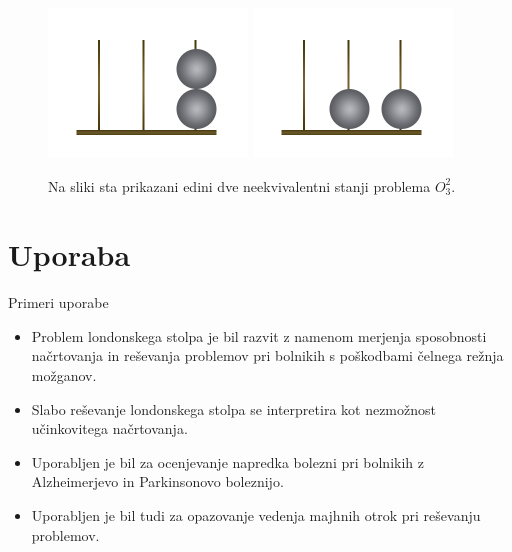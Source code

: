 \documentclass[dvipsnames]{beamer}
\newcommand{\graf}[1][G]{\ensuremath{#1 = (V(#1), E(#1))}}
\DeclareMathOperator {\stopnja} {deg}
\begin{document}
\begin{frame}
    \begin{figure}[h]
        \includegraphics[width=150pt]{../img/oxford-tower-O^2_3-towerlike.png}
        \includegraphics[width=150pt]{../img/oxford-tower-O^2_3-flat.png}
        \caption{Na sliki sta prikazani edini dve neekvivalentni stanji problema $O^2_3$. }
        \label{fig:neekviv-oxf-stanji}
    \end{figure}
\end{frame}

%    

\section{Uporaba}
\begin{frame}{Primeri uporabe}
    \begin{itemize}
        \item Problem londonskega stolpa je bil razvit z namenom merjenja sposobnosti načrtovanja in reševanja problemov pri bolnikih s poškodbami čelnega režnja možganov.
        \item Slabo reševanje londonskega stolpa se interpretira kot nezmožnost učinkovitega načrtovanja.
        \item Uporabljen je bil za ocenjevanje napredka bolezni pri bolnikih z Alzheimerjevo in Parkinsonovo boleznijo.
        \item Uporabljen je bil tudi za opazovanje vedenja majhnih otrok pri reševanju problemov.
    \end{itemize}
\end{frame}
\end{document}
